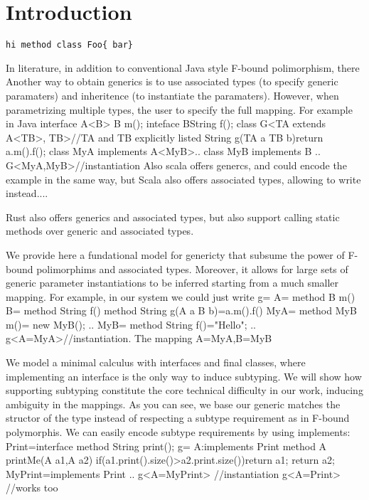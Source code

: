 \section{Introduction}
\begin{lstlisting}
hi method class Foo{ bar}
\end{lstlisting}

In literature, in addition to conventional Java style F-bound polimorphism, there
Another way to obtain generics is to use associated types (to specify generic paramaters) and inheritence (to instantiate the paramaters).
However, when parametrizing multiple types, the user to specify the full mapping.
For example in Java
    interface A<B>{ B m(); }
    inteface B{String f();}
    class G<TA extends A<TB>, TB>{//TA and TB explicitly listed
      String g(TA a TB b){return a.m().f();}
    }
    class MyA implements A<MyB>{..}
    class MyB implements B {..}
    G<MyA,MyB>//instantiation
Also scala offers genercs, and could encode the example in the same way, but Scala
also offers associated types, allowing to write instead....

Rust also offers generics and associated types, but also support calling static methods
over generic and associated types.

We provide here a fundational model for genericty that subsume the power
of F-bound polimorphims and  associated types.
Moreover, it allows for large sets of generic parameter instantiations to be inferred starting from a much smaller mapping.
For example, in our system we could just write
    g={
      A={ method B m()}
      B={ method String f()}
      method String g(A a B b)=a.m().f()
    }
    MyA={ method MyB m()= new MyB(); ..}
    MyB={ method String f()="Hello"; ..}
    g<A=MyA>//instantiation. The mapping A=MyA,B=MyB

We model a minimal calculus with interfaces and final classes, where implementing an interface is the only way to induce subtyping.
We will show how supporting subtyping constitute the core technical difficulty in our work, inducing ambiguity in the mappings.
As you can see, we base our generic matches the structor of the type instead of respecting a subtype requirement as in F-bound polymorphis.
We can easily encode subtype requirements by using implements:
Print=interface{ method String print();}
g={
  A:{implements Print}
  method A printMe(A a1,A a2){ if(a1.print().size()>a2.print.size()){return a1;} return a2;}
  }
MyPrint={implements Print ..}
g<A=MyPrint> //instantiation
g<A=Print> //works too


